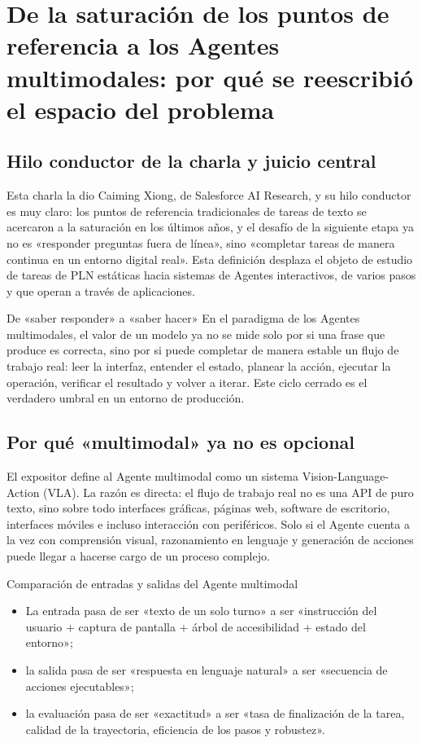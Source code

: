 \section{De la saturación de los puntos de referencia a los Agentes multimodales: por qué se reescribió el espacio del problema}

\subsection{Hilo conductor de la charla y juicio central}
Esta charla la dio Caiming Xiong, de Salesforce AI Research, y su hilo conductor es muy claro: los puntos de referencia tradicionales de tareas de texto se acercaron a la saturación en los últimos años, y el desafío de la siguiente etapa ya no es «responder preguntas fuera de línea», sino «completar tareas de manera continua en un entorno digital real». Esta definición desplaza el objeto de estudio de tareas de PLN estáticas hacia sistemas de Agentes interactivos, de varios pasos y que operan a través de aplicaciones.

\begin{importantbox}{De «saber responder» a «saber hacer»}
En el paradigma de los Agentes multimodales, el valor de un modelo ya no se mide solo por si una frase que produce es correcta, sino por si puede completar de manera estable un flujo de trabajo real: leer la interfaz, entender el estado, planear la acción, ejecutar la operación, verificar el resultado y volver a iterar. Este ciclo cerrado es el verdadero umbral en un entorno de producción.
\end{importantbox}

\subsection{Por qué «multimodal» ya no es opcional}
El expositor define al Agente multimodal como un sistema Vision-Language-Action (VLA). La razón es directa: el flujo de trabajo real no es una API de puro texto, sino sobre todo interfaces gráficas, páginas web, software de escritorio, interfaces móviles e incluso interacción con periféricos. Solo si el Agente cuenta a la vez con comprensión visual, razonamiento en lenguaje y generación de acciones puede llegar a hacerse cargo de un proceso complejo.

\begin{knowledgebox}{Comparación de entradas y salidas del Agente multimodal}
\begin{itemize}
    \item La entrada pasa de ser «texto de un solo turno» a ser «instrucción del usuario + captura de pantalla + árbol de accesibilidad + estado del entorno»;
    \item la salida pasa de ser «respuesta en lenguaje natural» a ser «secuencia de acciones ejecutables»;
    \item la evaluación pasa de ser «exactitud» a ser «tasa de finalización de la tarea, calidad de la trayectoria, eficiencia de los pasos y robustez».
\end{itemize}
\end{knowledgebox}

